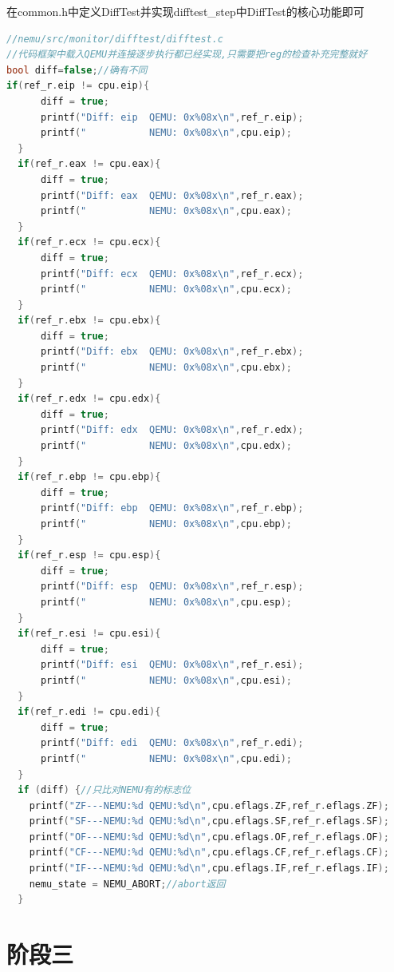 \documentclass[UTF8,a4paper,10pt]{ctexart}
\begin{document}
{{    在common.h中定义DiffTest并实现difftest\_step中DiffTest的核心功能即可
    \begin{lstlisting}[title=DiffTest,frame=trbl,language={C++}]
//nemu/src/monitor/difftest/difftest.c
//代码框架中载入QEMU并连接逐步执行都已经实现,只需要把reg的检查补充完整就好
bool diff=false;//确有不同
if(ref_r.eip != cpu.eip){
      diff = true;
      printf("Diff: eip  QEMU: 0x%08x\n",ref_r.eip);
      printf("           NEMU: 0x%08x\n",cpu.eip);
  }
  if(ref_r.eax != cpu.eax){
      diff = true;
      printf("Diff: eax  QEMU: 0x%08x\n",ref_r.eax);
      printf("           NEMU: 0x%08x\n",cpu.eax);
  }
  if(ref_r.ecx != cpu.ecx){
      diff = true;
      printf("Diff: ecx  QEMU: 0x%08x\n",ref_r.ecx);
      printf("           NEMU: 0x%08x\n",cpu.ecx);
  }
  if(ref_r.ebx != cpu.ebx){
      diff = true;
      printf("Diff: ebx  QEMU: 0x%08x\n",ref_r.ebx);
      printf("           NEMU: 0x%08x\n",cpu.ebx);
  }
  if(ref_r.edx != cpu.edx){
      diff = true;
      printf("Diff: edx  QEMU: 0x%08x\n",ref_r.edx);
      printf("           NEMU: 0x%08x\n",cpu.edx);
  }
  if(ref_r.ebp != cpu.ebp){
      diff = true;
      printf("Diff: ebp  QEMU: 0x%08x\n",ref_r.ebp);
      printf("           NEMU: 0x%08x\n",cpu.ebp);
  }
  if(ref_r.esp != cpu.esp){
      diff = true;
      printf("Diff: esp  QEMU: 0x%08x\n",ref_r.esp);
      printf("           NEMU: 0x%08x\n",cpu.esp);
  }
  if(ref_r.esi != cpu.esi){
      diff = true;
      printf("Diff: esi  QEMU: 0x%08x\n",ref_r.esi);
      printf("           NEMU: 0x%08x\n",cpu.esi);
  }
  if(ref_r.edi != cpu.edi){
      diff = true;
      printf("Diff: edi  QEMU: 0x%08x\n",ref_r.edi);
      printf("           NEMU: 0x%08x\n",cpu.edi);
  }
  if (diff) {//只比对NEMU有的标志位
    printf("ZF---NEMU:%d QEMU:%d\n",cpu.eflags.ZF,ref_r.eflags.ZF);
    printf("SF---NEMU:%d QEMU:%d\n",cpu.eflags.SF,ref_r.eflags.SF);
    printf("OF---NEMU:%d QEMU:%d\n",cpu.eflags.OF,ref_r.eflags.OF);
    printf("CF---NEMU:%d QEMU:%d\n",cpu.eflags.CF,ref_r.eflags.CF);
    printf("IF---NEMU:%d QEMU:%d\n",cpu.eflags.IF,ref_r.eflags.IF);
    nemu_state = NEMU_ABORT;//abort返回
  }
    \end{lstlisting}

}
}
\section{阶段三}
\end{document}
